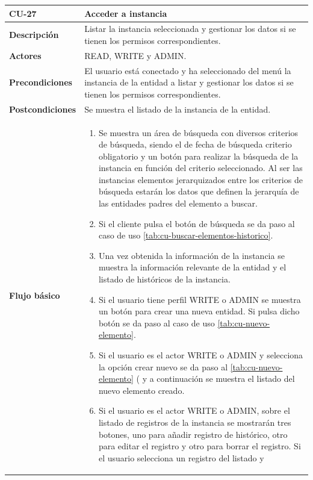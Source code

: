 \begin{table} [H]
    \centering
    \setlength{\leftmargini}{0.4cm}
	\resizebox{14cm}{!} { %
    \begin{tabular}{| m{3cm} | m{11cm} |}   
    \hline
	  \textbf{CU-27} & \textbf{Acceder a instancia} \\\hline
	  \textbf{Descripción} & Listar la instancia seleccionada y gestionar los datos si se tienen los permisos correspondientes. \\\hline
	  \textbf{Actores} & READ, WRITE y ADMIN. \\\hline
	  \textbf{Precondiciones} & El usuario está conectado y ha seleccionado del menú la instancia de la entidad a listar y gestionar los datos si se tienen los permisos correspondientes. \\\hline
	  \textbf{Postcondiciones} & Se muestra el listado de la instancia de la entidad. \\\hline
	  \textbf{Flujo básico} & 
		\begin{enumerate}
	  	\item Se muestra un área de búsqueda con diversos criterios de búsqueda, siendo el de fecha de búsqueda criterio obligatorio y un botón para realizar la búsqueda de la instancia en función del criterio seleccionado. Al ser las instancias elementos jerarquizados entre los criterios de búsqueda estarán los datos que definen la jerarquía de las entidades padres del elemento a buscar.
	  	\item Si el cliente pulsa el botón de búsqueda se da paso al caso de uso \ref{tab:cu-buscar-elementos-historico}. 
	  	\item Una vez obtenida la información de la instancia se muestra la información relevante de la entidad y el listado de históricos de la instancia.
	  	\item Si el usuario tiene perfil WRITE o ADMIN se muestra un botón para crear una nueva entidad. Si pulsa dicho botón se da paso al caso de uso \ref{tab:cu-nuevo-elemento}.
	  	\item Si el usuario es el actor WRITE o ADMIN y selecciona la opción crear nuevo se da paso al \ref{tab:cu-nuevo-elemento} (\pageref{tab:cu-nuevo-elemento} y a continuación se muestra el listado del nuevo elemento creado.
		\item Si el usuario es el actor WRITE o ADMIN, sobre el listado de registros de la instancia se mostrarán tres botones, uno para añadir registro de histórico, otro para editar el registro y otro para borrar el registro. Si el usuario selecciona un registro del listado y

\end{enumerate}
\end{tabular}}
\end{table}
